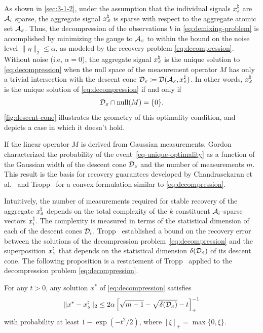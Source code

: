 As shown in \autoref{sec:3-1-2}, under the assumption that the individual signals $x_i^{\natural}$ are $\mathcal{A}_i$ sparse, the aggregate signal $x_{\scriptscriptstyle S}^\natural$ is sparse with respect to the aggregate atomic set $\mathcal{A}_{\scriptscriptstyle S}$.
Thus, the decompression of the observations $b$ in \eqref{eq:demixing-problem} is accomplished by minimizing the gauge to $\mathcal{A}_{\scriptscriptstyle S}$ to within the bound on the noise level $\|\eta\|_2\le\alpha$, as modeled by the recovery problem \eqref{eq:decompression}.
Without noise (i.e, $\alpha=0$), the aggregate signal $x_{\scriptscriptstyle S}^\natural$ is the unique solution to \eqref{eq:decompression} when the null space of the measurement operator $M$ has only a trivial intersection with the descent cone $\mathcal{D}_{\scriptscriptstyle S}\coloneqq\mathcal{D}(\mathcal{A}_{\scriptscriptstyle S}, x_{\scriptscriptstyle S}^\natural)$.
In other words, $x_{\scriptscriptstyle S}^\natural$ is the unique solution of \eqref{eq:decompression} if and only if 
\begin{equation}\label{eq-unique-optimality}
  \mathcal{D}_{\scriptscriptstyle S}\cap\operatorname{null}(M) = \{0\}.  
\end{equation}
\autoref{fig:descent-cone} illustrates the geometry of this optimality condition, and depicts a case in which it doesn't hold.

If the linear operator $M$ is derived from Gaussian measurements, Gordon~\cite{gordon1988milman} characterized the probability of the event~\eqref{eq-unique-optimality} as a function of the Gaussian width of the descent cone $\mathcal{D}_{\scriptscriptstyle S}$ and the number of measurements $m$. This result is the basis for recovery guarantees developed by Chandrasekaran et al.~\cite{chandrasekaran2012convex} and Tropp~\cite{tropp2015convex} for a convex formulation similar to \eqref{eq:decompression}.

Intuitively, the number of measurements required for stable recovery of the aggregate $x_{\scriptscriptstyle S}^\natural$ depends on the total complexity of the $k$ constituent $\mathcal{A}_i$-sparse vectors $x_i^{\natural}$. The complexity is measured in terms of the statistical dimension of each of the descent cones $\mathcal{D}_i$.
Tropp~\cite[Corollary~3.5]{tropp2015convex} established a bound on the recovery error between the solutions of the decompression problem~\eqref{eq:decompression} and the superposition $x_{\scriptscriptstyle S}^{\natural}$ that depends on the statistical dimension $\delta(\mathcal{D}_{\scriptscriptstyle S})$ of its descent cone. The following proposition is a restatement of Tropp~\cite[Corollary~3.5]{tropp2015convex} applied to the decompression problem \eqref{eq:decompression}.

\begin{proposition}%
    \label{thm:tropp}
    For any $t>0$, any solution $x^*$ of \eqref{eq:decompression} satisfies
    \begin{equation*}
        \|x^* - x_{\scriptscriptstyle S}^\natural\|_2 \leq 2\alpha\left[\sqrt{m - 1} - \sqrt{\delta(\mathcal{D}_{\scriptscriptstyle S})} - t\right]_+^{-1}
    \end{equation*}
    with probability at least $1 - \exp(-t^2/2)$, where $[\xi]_+=\max\{0,\xi\}$. 
\end{proposition}

